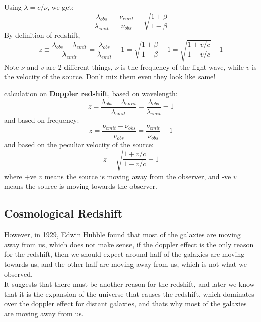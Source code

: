 \begin{foundation}
    Using $\lambda = c/\nu$, we get:
    \[
        \frac{\lambda_{obs}}{\lambda_{emit}} = \frac{\nu_{emit}}{\nu_{obs}} = \sqrt{\frac{1+\beta}{1-\beta}}
    \]
    By definition of redshift,
    \[
        z \equiv \frac{\lambda_{obs}-\lambda_{emit}}{\lambda_{emit}} = \frac{\lambda_{obs}}{\lambda_{emit}} - 1
        = \sqrt{\frac{1+\beta}{1-\beta}} - 1
        = \sqrt{\frac{1+v/c}{1-v/c}} - 1
    \]
    Note $\nu$ and $v$ are 2 different things, $\nu$ is the frequency of the light wave, while $v$ is the velocity of the source. Don't mix them even they look like same!
\end{foundation}

\bigskip\noindent
\begin{theory}
    calculation on \textbf{Doppler redshift}, based on wavelength:
    \[
        z = \frac{\lambda_{obs} - \lambda_{emit}}{\lambda_{emit}} = \frac{\lambda_{obs}}{\lambda_{emit}} - 1
    \]
    and based on frequency:
    \[
        z = \frac{\nu_{emit} - \nu_{obs}}{\nu_{obs}} = \frac{\nu_{emit}}{\nu_{obs}} - 1
    \]
    and based on the peculiar velocity of the source:
    \[
        z = \sqrt{\frac{1 + v/c}{1 - v/c}} - 1
    \]
    where +ve $v$ means the source is moving away from the observer, and -ve $v$ means the source is moving towards the observer. \\
\end{theory}

\bigskip\noindent \bigskip\noindent \bigskip\noindent
\subsection{Cosmological Redshift}
\begin{intuition}
    However, in 1929, Edwin Hubble found that most of the galaxies are moving away from us, which does not make sense, if the doppler effect is the only reason for the redshift, then we should expect around half of the galaxies are moving towards us, and the other half are moving away from us, which is not what we observed. \\

    It suggests that there must be another reason for the redshift, and later we know that it is the expansion of the universe that causes the redshift, which dominates over the doppler effect for distant galaxies, and thats why most of the galaxies are moving away from us. \\
\end{intuition}

